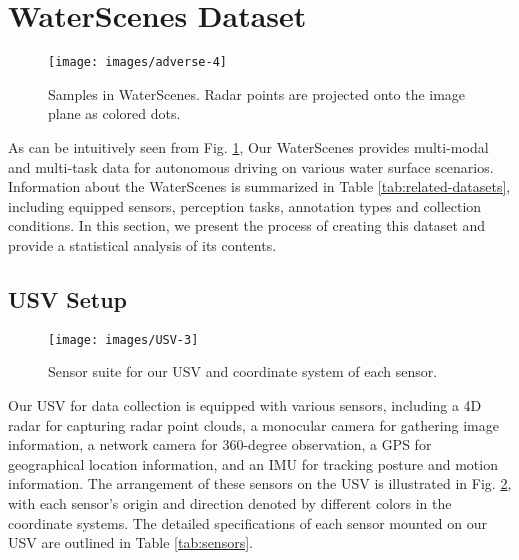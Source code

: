\documentclass[lettersize,journal]{IEEEtran}
\begin{document}
\section{WaterScenes Dataset}
\label{sec:WaterScenes}

\begin{figure}[htbp]
\begin{center}
\texttt{[image: images/adverse-4]}
\end{center}
\vspace{-2mm}
\caption{Samples in WaterScenes. Radar points are projected onto the image plane as colored dots.}
\label{fig:samples}
\end{figure}




As can be intuitively seen from Fig. \ref{fig:samples}, Our WaterScenes provides multi-modal and multi-task data for autonomous driving on various water surface scenarios. 
Information about the WaterScenes is summarized in Table \ref{tab:related-datasets}, including equipped sensors, perception tasks, annotation types and collection conditions. 
In this section, we present the process of creating this dataset and provide a statistical analysis of its contents.


\subsection{USV Setup}

\begin{figure}[htbp]
\begin{center}
\texttt{[image: images/USV-3]}
\end{center}
\vspace{-2mm}
\caption{Sensor suite for our USV and coordinate system of each sensor. }
\label{fig:usv}
\end{figure}

Our USV for data collection is equipped with various sensors, including a 4D radar for capturing radar point clouds, a monocular camera for gathering image information, a network camera for 360-degree observation, a GPS for geographical location information, and an IMU for tracking posture and motion information. 
The arrangement of these sensors on the USV is illustrated in Fig. \ref{fig:usv}, with each sensor's origin and direction denoted by different colors in the coordinate systems. 
The detailed specifications of each sensor mounted on our USV are outlined in Table \ref{tab:sensors}.
\end{document}
